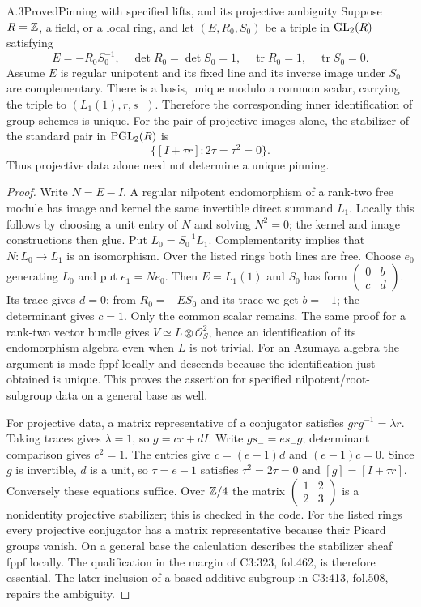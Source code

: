 \begin{statement}{A.3}{Proved}{Pinning with specified lifts, and its projective ambiguity}
Suppose $R=\mathbb Z$, a field, or a local ring, and let $(E,R_0,S_0)$ be a
triple in $\operatorname{GL}_2(R)$ satisfying
\[
 E=-R_0S_0^{-1},\quad \det R_0=\det S_0=1,\quad
 \operatorname{tr}R_0=1,\quad\operatorname{tr}S_0=0.
\]
Assume $E$ is regular unipotent and its fixed line and its inverse
image under $S_0$ are complementary. There is a basis, unique modulo
a common scalar, carrying the triple to
$(L_1(1),r,s_-)$. Therefore the corresponding inner identification
of group schemes is unique. For the pair of projective images alone,
the stabilizer of the standard pair in $\operatorname{PGL}_2(R)$ is
\[
 \{[I+\tau r]:2\tau=\tau^2=0\}.
\]
Thus projective data alone need not determine a unique pinning.
\end{statement}
\begin{proof}
Write $N=E-I$. A regular nilpotent endomorphism of a rank-two free
module has image and kernel the same invertible direct summand $L_1$.
Locally this follows by choosing a unit entry of $N$ and solving
$N^2=0$; the kernel and image constructions then glue. Put
$L_0=S_0^{-1}L_1$. Complementarity implies that
$N:L_0\to L_1$ is an isomorphism. Over the listed rings both lines
are free. Choose $e_0$ generating $L_0$ and put $e_1=N e_0$.
Then $E=L_1(1)$ and $S_0$ has form
$\left(\begin{smallmatrix}0&b\\c&d\end{smallmatrix}\right)$.
Its trace gives $d=0$; from $R_0=-ES_0$ and its trace we get
$b=-1$; the determinant gives $c=1$. Only the common scalar remains.
The same proof for a rank-two vector bundle gives
$V\simeq L\otimes\mathcal O_S^2$, hence an identification of its
endomorphism algebra even when $L$ is not trivial. For an Azumaya
algebra the argument is made fppf locally and descends because the
identification just obtained is unique. This proves the assertion for
specified nilpotent/root-subgroup data on a general base as well.

For projective data, a matrix representative of a conjugator satisfies
$grg^{-1}=\lambda r$. Taking traces gives $\lambda=1$, so
$g=cr+dI$. Write $gs_-=e s_-g$; determinant comparison gives $e^2=1$.
The entries give $c=(e-1)d$ and $(e-1)c=0$. Since $g$ is invertible,
$d$ is a unit, so $\tau=e-1$ satisfies $\tau^2=2\tau=0$ and
$[g]=[I+\tau r]$. Conversely these equations suffice. Over $\mathbb Z/4$
the matrix $\left(\begin{smallmatrix}1&2\\2&3\end{smallmatrix}\right)$
is a nonidentity projective stabilizer; this is checked in the code.
For the listed rings every projective conjugator has a matrix
representative because their Picard groups vanish. On a general base
the calculation describes the stabilizer sheaf fppf locally.
The qualification in the margin of C3:323, fol.462, is therefore
essential. The later inclusion of a based additive subgroup in
C3:413, fol.508, repairs the ambiguity.
\end{proof}

